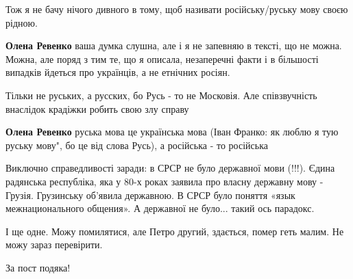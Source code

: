 \begin{itemize}
Тож я не бачу нічого дивного в тому, щоб називати російську/руську мову своєю
рідною.

\begin{itemize}
 
\textbf{Олена Ревенко} ваша думка слушна, але і я не запевняю в тексті, що не
можна. Можна, але поряд з тим те, що я описала, незаперечні факти і в більшості
випадків йдеться про українців, а не етнічних росіян.

 
Тільки не руських, а русских, бо Русь - то не Московія. Але співзвучність
внаслідок крадіжки робить свою злу справу

 
\textbf{Олена Ревенко} руська мова це українська мова (Іван Франко: як люблю я
тую руську мову", бо це від слова Русь), а російська - то російська

\end{itemize}

 

Виключно справедливості заради: в СРСР не було державної мови (!!!). Єдина
радянська республіка, яка у 80-х роках заявила про власну державну мову -
Грузія. Грузинську об’явила державною. В СРСР було поняття «язык
межнационального общения». А державної не було... такий ось парадокс.

І ще одне. Можу помилятися, але Петро другий, здається, помер геть малим. Не
можу зараз перевірити.

За пост подяка!


\end{itemize}
